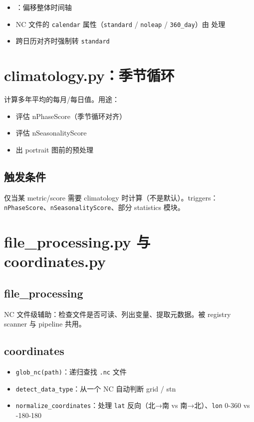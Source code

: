 \begin{itemize}
  \item {}：偏移整体时间轴
  \item NC 文件的 \texttt{calendar} 属性（\texttt{standard} / \texttt{noleap} / \texttt{360\_day}）由  处理
  \item 跨日历对齐时强制转 \texttt{standard}
\end{itemize}

\section{climatology.py：季节循环}

 计算多年平均的每月/每日值。用途：

\begin{itemize}
  \item 评估 nPhaseScore（季节循环对齐）
  \item 评估 nSeasonalityScore
  \item 出 portrait 图前的预处理
\end{itemize}

\subsection{触发条件}

仅当某 metric/score 需要 climatology 时计算（不是默认）。triggers：\texttt{nPhaseScore}、\texttt{nSeasonalityScore}、部分 statistics 模块。

\section{file\_processing.py 与 coordinates.py}

\subsection{file\_processing}

NC 文件级辅助：检查文件是否可读、列出变量、提取元数据。被 registry scanner 与 pipeline 共用。

\subsection{coordinates}

\begin{itemize}
  \item \texttt{glob\_nc(path)}：递归查找 \texttt{.nc} 文件
  \item \texttt{detect\_data\_type}：从一个 NC 自动判断 grid / stn
  \item \texttt{normalize\_coordinates}：处理 \texttt{lat} 反向（北→南 vs 南→北）、\texttt{lon} 0-360 vs -180-180
\end{itemize}


